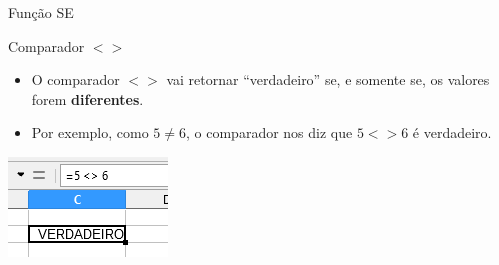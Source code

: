 \begin{frame}{Função SE}
	\begin{block}{Comparador $ <> $}
		\begin{itemize}
			\item O comparador $ <> $ vai retornar ``verdadeiro'' se, e somente se, os valores forem \textbf{diferentes}.
			\item Por exemplo, como $5\neq6$, o comparador nos diz que $ 5<>6 $ é verdadeiro.
		\end{itemize}
	\end{block}
	
	\centering
	\includegraphics[width=0.6\linewidth]{Figuras/Ch06/fig44.16}
\end{frame}


